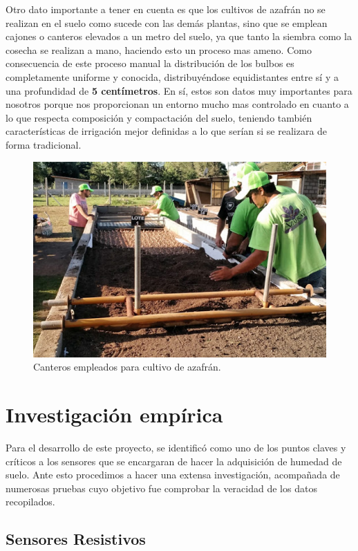 \documentclass{article}
\begin{document}
Otro dato importante a tener en cuenta es que los cultivos de azafrán no se realizan en el suelo como sucede con las demás plantas, sino que se emplean cajones o canteros elevados a un metro del suelo, ya que tanto la siembra como la cosecha se realizan a mano, haciendo esto un proceso mas ameno. Como consecuencia de este proceso manual la distribución de los bulbos es completamente uniforme y conocida, distribuyéndose equidistantes entre sí y a una profundidad de \textbf{5 centímetros}. En sí, estos son datos muy importantes para nosotros porque nos proporcionan un entorno mucho mas controlado en cuanto a lo que respecta composición y compactación del suelo, teniendo también características de irrigación mejor definidas a lo que serían si se realizara de forma tradicional.

\begin{figure}[h!]
    \centering
    \includegraphics[width=\textwidth]{Imagenes/cantero.png}
    \caption{Canteros empleados para cultivo de azafrán.}
    \label{fig:my_label}
\end{figure}


\section{Investigación empírica}

Para el desarrollo de este proyecto, se identificó como uno de los puntos claves y críticos a los sensores que se encargaran de hacer la adquisición de humedad de suelo. Ante esto procedimos a hacer una extensa investigación, acompañada de numerosas pruebas cuyo objetivo fue comprobar la veracidad de los datos recopilados.


\subsection{Sensores Resistivos}
\end{document}
